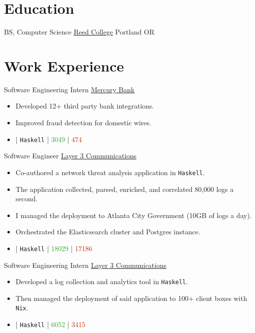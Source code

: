 \documentclass[10pt,letterpaper,sans]{moderncv}
\newcommand{\wlink}[2]{\textcolor[HTML]{0020B6}{\href{#1}{#2}}}
\newcommand{\ghlink}[2]{\wlink{https://github.com/#1}{#2}}
\newcommand{\ghrepo}[1]{\ghlink{#1}{\faGithub}}
\newcommand{\ghlang}[1]{\texttt{#1}}
\newcommand{\ghadd}[1]{\textcolor[HTML]{30A622}{{\faPlusCircle} #1}}
\newcommand{\ghrem}[1]{\textcolor[HTML]{BD2C00}{{\faMinusCircle} #1}}
\newcommand{\ghub}[4]{\ghrepo{#2} | \ghlang{#1} | \ghadd{#3} | \ghrem{#4}}
\newcommand{\lang}[1]{\texttt{#1}}
\begin{document}
\makecvtitle{}

\section{Education}
        {BS, Computer Science}
        {\wlink{https://reed.edu/}{Reed College}}
        {Portland OR}{}
        {}

\vfill{}

\section{Work Experience}

        {Software Engineering Intern}
        {\wlink{https://mercury.co/}{Mercury Bank}}
        {}{}
        {
\begin{itemize}         
\item Developed 12+ third party bank integrations.
\item Improved fraud detection for domestic wires.
\item \ghub{Haskell}{mercury-technologies}{3049}{474}
\end{itemize}
}

        {Software Engineer}
        {\wlink{http://layer3com.com/}{Layer 3 Communications}}
        {}{}
        {
\begin{itemize}
\item Co-authored a network threat analysis application in \lang{Haskell}.
\item The application collected, parsed, enriched, and correlated 80,000 logs
  a second.
\item I managed the deployment to Atlanta City Government (10GB of logs a day).
\item Orchestrated the Elasticsearch cluster and Postgres instance.
\item \ghub{Haskell}{layer-3-communications}{18029}{17186}
\end{itemize}
}

        {Software Engineering Intern}
        {\wlink{http://layer3com.com/}{Layer 3 Communications}}
        {}{}
        {
\begin{itemize}
\item Developed a log collection and analytics tool in \lang{Haskell}.
\item Then managed the deployment of said application to 100+ client boxes with \lang{Nix}.
\item \ghub{Haskell}{layer-3-communications}{6052}{3415}
\end{itemize}
}
\end{document}
